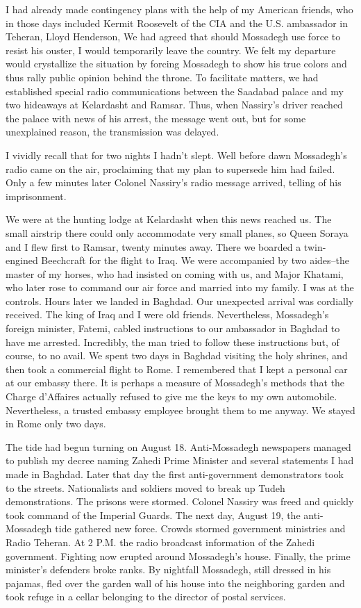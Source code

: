 I had already made contingency plans with the help of my American friends, who in those days included Kermit Roosevelt of the CIA and the U.S. ambassador in Teheran, Lloyd Henderson, We had agreed that should Mossadegh use force to resist his ouster, I would temporarily leave the country. We felt my departure would crystallize the situation by forcing Mossadegh to show his true colors and thus rally public opinion behind the throne. To facilitate matters, we had established special radio communications between the Saadabad palace and my two hideaways at Kelardasht and Ramsar. Thus, when Nassiry’s driver reached the palace with news of his arrest, the message went out, but for some unexplained reason, the transmission was delayed. 


I vividly recall that for two nights I hadn't slept. Well before dawn Mossadegh’s radio came on the air, proclaiming that my plan to supersede him had failed. Only a few minutes later Colonel Nassiry's radio message arrived, telling of his imprisonment. 

We were at the hunting lodge at Kelardasht when this news reached us. The small airstrip there could only accommodate very small planes, so Queen Soraya and I flew first to Ramsar, twenty minutes away. There we boarded a twin-engined Beechcraft for the flight to Iraq. We were accompanied by two aides--the master of my horses, who had insisted on coming with us, and Major Khatami, who later rose to command our air force and married into my family. I was at the controls. Hours later we landed in Baghdad. Our unexpected arrival was cordially received. The king of Iraq and I were old friends. Nevertheless, Mossadegh's foreign minister, Fatemi, cabled instructions to our ambassador in Baghdad to have me arrested. Incredibly, the man tried to follow these instructions but, of course, to no avail. We spent two days in Baghdad visiting the holy shrines, and then took a commercial flight to Rome. I remembered that I kept a personal car at our embassy there. It is perhaps a measure of Mossadegh’s methods that the Charge d'Affaires actually refused to give me the keys to my own automobile. Nevertheless, a trusted embassy employee brought them to me anyway. We stayed in Rome only two days. 

The tide had begun turning on August 18. Anti-Mossadegh newspapers managed to publish my decree naming Zahedi Prime Minister and several statements I had made in Baghdad. Later that day the first anti-government demonstrators took to the streets. Nationalists and soldiers moved to break up Tudeh demonstrations. The prisons were stormed. Colonel Nassiry was freed and quickly took command of the Imperial Guards. The next day, August 19, the anti-Mossadegh tide gathered new force. Crowds stormed government ministries and Radio Teheran. At 2 P.M. the radio broadcast information of the Zahedi government. Fighting now erupted around Mossadegh’s house. Finally, the prime minister's defenders broke ranks. By nightfall Mossadegh, still dressed in his pajamas, fled over the garden wall of his house into the neighboring garden and took refuge in a cellar belonging to the director of postal services. 

